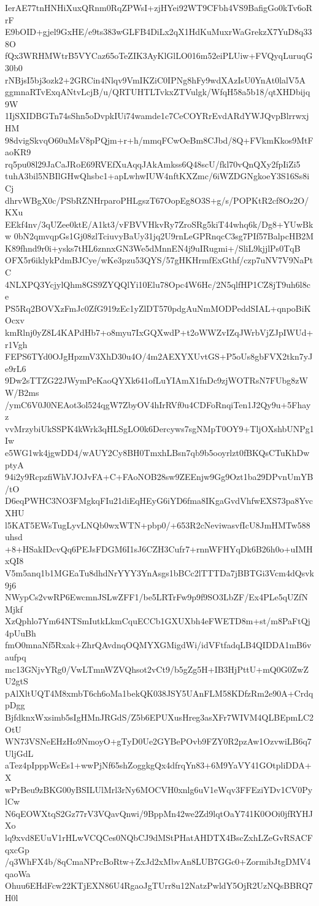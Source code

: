 IerAE77tnHNHiXuxQRnm0RqZPWsI+zjHYei92WT9CFbh4VS9BafigGo0kTv6oRrF
E9bOID+gjel9GxHE/e9ts383wGLFB4DiLx2qX1HdKuMuxrWaGrekzX7YuD8q338O
fQx3WRHMWtrB5VYCaz65oTeZIK3AyKlGlLO016m52eiPLUiw+FVQyqLuruqG30b0
rNBjsI5bj3ozk2+2GRCin4Nlqv9VmIKZiC0IPNg8hFy9wdXAzIsU0YnAt0lalV5A
ggmnaRTvExqANtvLcjB/u/QRTUHTLTvkxZTVulgk/WfqH58a5b18/qtXHDbijq9W
1IjSXIDBGTn74sShn5oDvpkIUi74wamde1c7CeCOYRrEvdARdYWJQvpBlrrwxjHM
98dvigSkvqO60uMsV8pPQjm+r+h/mmqFCwOeBm8CJbd/8Q+FVkmKkos9MtFaoKR9
rq5pu08l29JaCaJRoE69RVEfXuAqqJAkAmkss6Q48scU/fkl70vQnQXy2fpIiZi5
tuhA3bil5NBIlGHwQhsbc1+apLwhwIUW4nftKXZmc/6iWZDGNgkoeY3S16Ss8iCj
dhrvWBgX0c/PSbRZNHrparoPHLgszT67OopEg8O3S+g/s/POPKtR2cf8Oz2O/KXu
EEkf4nv/3qUZee0ktE/A1kt3/vFBVVHkvRy7ZroSRg5kiT44whq6k/Dg8+YUwBkw
0bN2qmvqpGs1Gj08zlTciuvyBaUy31jq2U9rnLeGPRnqcC3sg7PIf57BalpcHB2M
K89fhnd9r0i+ysks7tHL6znnxGN3We5dMnnEN4j9uIRugmi+/SliL9kjjlPs0TqB
OFX5r6iklykPdmBJCye/wKe3pzu53QYS/57gHKHrmfExGthf/czp7uNV7V9NaPtC
4NLXPQ3YcjylQhm8GS9ZYQQlYi10Elu78Opc4W6Hc/2N5qlfHP1CZ8jT9uh6l8ce
PS5Rq2BOVXzFmJc0ZfG919zEc1yZlDT570pdgAuNmMODPeddSIAL+qnpoBiKOcxv
kmRlnj0yZ8L4KAPdHb7+o8myu7IxGQXwdP+t2oWWZvIZqJWrbVjZJpIWUd+r1Vgh
FEPS6TYd0OJgHpzmV3XhD30u4O/4m2AEXYXUvtGS+P5oUs8gbFVX2tkn7yJe9rL6
9Dw2sTTZG22JWymPeKaoQYXk641ofLuYIAmX1fnDc9zjWOTRsN7FUbg8zWW/B2ms
/ymC6V0J0NEAot3ol524qgW7ZbyOV4hIrRVf0u4CDFoRnqiTen1J2Qy9u+5Fhayz
vvMrzybiUkSSPK4kWrk3qHLSgLO0k6Dercyws7sgNMpT0OY9+TljOXshbUNPg1Iw
e5WG1wk4jgwDD4/wAUY2Cy8BH0TmxhLBsn7qb9b5ooyrlzt0fBKQsCTuKhDwptyA
94i2y9RcpzfiWhVJOJvFA+C+FAoNOB28sw9ZEEnjw9Gg9Ozt1ba29DPvnUmYB/tO
D6eqPWHC3NO3FMgkqFIu21diEqHEyG6iYD6fma8IKgaGvdVhfwEXS73pa8YvcXHU
l5KAT5EWsTugLyvLNQb0wxWTN+pbp0/+653R2cNeviwasvfIcU8JmHMTw588uhsd
+8+HSakIDcvQq6PEJsFDGM6I1sJ6CZH3Cufr7+rnnWFHYqDk6B26h0o+uIMHxQI8
V5m5anq1b1MGEaTu8dhdNrYYY3YnAsgs1bBCc2lTTTDa7jBBTGi3Vcm4dQsvk9j6
NWypCs2vwRP6EwcmnJSLwZFF1/be5LRTrFw9p9f9SO3LbZF/Ex4PLe5qUZfNMjkf
XzQphlo7Ym64NTSmIutkLkmCquECCb1GXUXbh4eFWETD8m+st/m8PaFtQj4pUuBh
fmO0mnaNf5Rxak+ZhrQAvdnqOQMYXGMigdWi/idVFtfadqLB4QIDDA1mB6vaufpq
mc13GNjvYRg0/VwLTmnWZVQhsot2vCt9/b5gZg5H+IB3HjPttU+mQ0G0ZwZU2gtS
pAlXltUQT4M8xmbT6ch6oMa1bekQK038JSY5UAnFLM58KDfzRm2e90A+CrdqpDgg
BjfdknxWxsimb5sIgHMnJRGdS/Z5b6EPUXusHreg3asXFr7WIVM4QLBEpmLC2OtU
WN73VSNeEHzHo9NmoyO+gTyD0Ue2GYBePOvb9FZY0R2pzAw1OzvwiLB6q7UljGdL
aTez4pIpppWcEs1+wwPjNf65shZoggkgQx4dfrqYn83+6M9YaVY41GOtpliDDA+X
wPrBeu9zBKG00yBSILUlMrl3rNy6MOCVH0xnlg6uV1eWqv3FFEziYDv1CV0PylCw
N6qEOWXtqS2Gz77rV3VQavQnwi/9BppMn42we2Zd9lqtOaY741K0OOi0jfRYHJXo
lq9xvd8EUuV1rHLwVCQCes0NQbCJ9dMStPHatAHDTX4BscZxhLZeGvRSACFqxcGp
/q3WhFX4b/8qCmaNPrcBoRtw+ZxJd2xMbvAn8LUB7GGc0+ZormibJtgDMV4qaoWa
Ohuu6EHdFcw22KTjEXN86U4RgaoJgTUrr8u12NatzPwldY5OjR2UzNQsBBRQ7H0l
